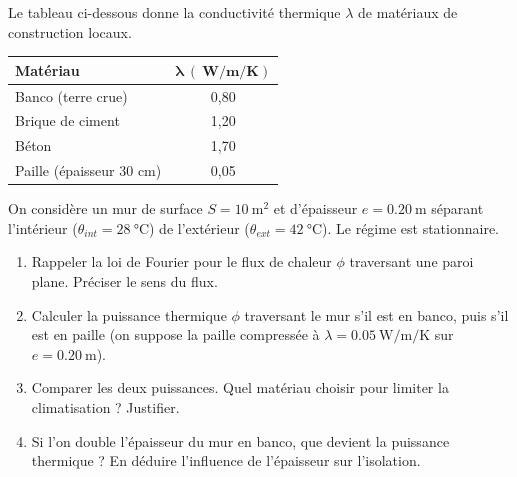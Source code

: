 \documentclass[11pt]{article}
\begin{document}
\begin{exercice}
Le tableau ci-dessous donne la conductivité thermique $\lambda$ de matériaux de construction locaux.
\begin{center}
\begin{tabular}{|l|c|}
\hline
\textbf{Matériau} & $\boldsymbol{\lambda\ (\SI{}{\watt\per\meter\per\kelvin})}$ \\
\hline
Banco (terre crue) & 0,80 \\
Brique de ciment & 1,20 \\
Béton & 1,70 \\
Paille (épaisseur 30 cm) & 0,05 \\
\hline
\end{tabular}
\end{center}
On considère un mur de surface $S = \SI{10}{\meter\squared}$ et d'épaisseur $e = \SI{0,20}{\meter}$ séparant l'intérieur ($\theta_{int} = \SI{28}{\celsius}$) de l'extérieur ($\theta_{ext} = \SI{42}{\celsius}$). Le régime est stationnaire.
\begin{enumerate}
    \item Rappeler la loi de Fourier pour le flux de chaleur $\phi$ traversant une paroi plane. Préciser le sens du flux.
    \item Calculer la puissance thermique $\phi$ traversant le mur s'il est en banco, puis s'il est en paille (on suppose la paille compressée à $\lambda = \SI{0,05}{\watt\per\meter\per\kelvin}$ sur $e = \SI{0,20}{\meter}$).
    \item Comparer les deux puissances. Quel matériau choisir pour limiter la climatisation ? Justifier.
    \item Si l'on double l'épaisseur du mur en banco, que devient la puissance thermique ? En déduire l'influence de l'épaisseur sur l'isolation.
\end{enumerate}
\end{exercice}
\end{document}
